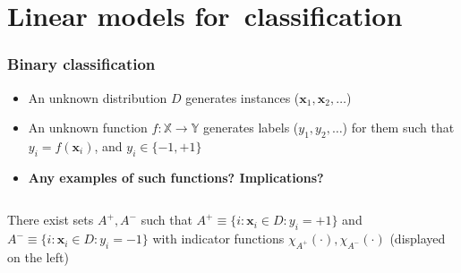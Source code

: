 \documentclass[usenames,dvipsnames,aspectratio=169]{beamer}
\begin{document}

\section{Linear models for~classification}




\begin{frame}
\frametitle{Binary classification}

\begin{itemize}

\item An unknown distribution $D$
generates instances ($\mathbf{x}_1, \mathbf{x}_2, \ldots$)

\pause
\item An unknown function 
$f: \mathbb{X} \to \mathbb{Y}$ generates labels
($y_1, y_2, \ldots$) for them
such that $y_i = f(\mathbf{x}_i)$, and $y_i \in \{-1, +1\}$

\pause
\item {\bf Any examples of such functions? Implications?}

\end{itemize}

\pause

\begin{columns}
\begin{column}{0.6\columnwidth}
  There exist sets $A^{+}, A^{-}$
  such that
    $A^{+} \equiv \{i: \mathbf{x}_i \in D: y_i = +1\}$
  and   
    $A^{-} \equiv \{i: \mathbf{x}_i \in D: y_i = -1\}$
  with indicator functions $\chi_{A^{+}}(\cdot), \chi_{A^{-}}(\cdot)$
  (displayed on the left)
\end{column}
\end{columns}

\end{frame}
\end{document}
